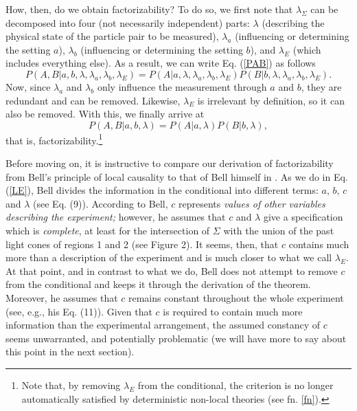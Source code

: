 \documentclass[letterpaper,12pt]{article}
\begin{document}
How, then, do we obtain factorizability? To do so, we first note that $\lambda_\Sigma$ can be decomposed into four (not necessarily independent) parts: $\lambda$ (describing the physical state of the particle pair to be measured), $\lambda_a$ (influencing or determining the setting $a$), $\lambda_b$ (influencing or determining the setting $b$), and $\lambda_E$ (which includes everything else). As a result, we can write Eq. (\ref{PAB}) as follows
\begin{equation} \label{LE}
P(A,B|a,b,\lambda, \lambda_a, \lambda_b, \lambda_E) = P(A|a,\lambda, \lambda_a, \lambda_b, \lambda_E) P(B|b,\lambda, \lambda_a, \lambda_b, \lambda_E).
\end{equation}
Now, since $\lambda_a$ and $\lambda_b$ only influence the measurement through $a$ and $b$, they are redundant and can be removed. Likewise, $\lambda_E$ is irrelevant by definition, so it can also be removed. With this, we finally arrive at
\begin{equation} 
P(A,B|a,b,\lambda) = P(A|a,\lambda) P(B|b,\lambda),
\end{equation}
that is, factorizability.\footnote{Note that, by removing $\lambda_E$ from the conditional, the criterion is no longer automatically satisfied by deterministic non-local theories (see fn. \ref{fn}).}

Before moving on, it is instructive to compare our derivation of factorizability from Bell's principle of local causality to that of Bell himself in \cite{Bell1990}. As we do in Eq. (\ref{LE}), Bell divides the information in the conditional into different terms: $a$, $b$, $c$ and $\lambda$ (see Eq. (9)). According to Bell, $c$ represents \emph{values of other variables describing the experiment;} however, he assumes that $c$ and $\lambda$ give a specification which is \emph{complete}, at least for the intersection of $\Sigma$ with the union of the past light cones of regions 1 and 2 (see Figure 2). It seems, then, that $c$ contains much more than a description of the experiment and is much closer to what we call $\lambda_E$. At that point, and in contrast to what we do, Bell does not attempt to remove $c$ from the conditional and keeps it through the derivation of the theorem. Moreover, he assumes that $c$ remains constant throughout the whole experiment (see, e.g., his Eq. (11)). Given that $c$ is required to contain much more information than the experimental arrangement, the assumed constancy of $c$ seems unwarranted, and potentially problematic (we will have more to say about this point in the next section).
\end{document}
